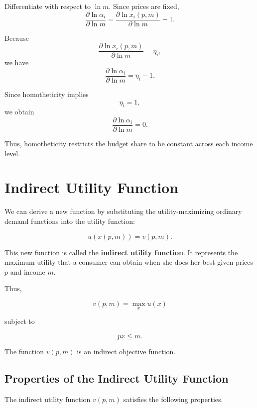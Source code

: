 Differentiate with respect to \(\ln m\). Since prices are fixed,
\[
\frac{\partial \ln \alpha_i}{\partial \ln m}
=
\frac{\partial \ln x_i(p,m)}{\partial \ln m}
-
1.
\]

Because
\[
\frac{\partial \ln x_i(p,m)}{\partial \ln m}
=
\eta_i,
\]
we have
\[
\frac{\partial \ln \alpha_i}{\partial \ln m}
=
\eta_i-1.
\]

Since homotheticity implies
\[
\eta_i=1,
\]
we obtain
\[
\frac{\partial \ln \alpha_i}{\partial \ln m}=0.
\]

Thus, homotheticity restricts the budget share to be constant across each income level.



\section{Indirect Utility Function}

We can derive a new function by substituting the utility-maximizing ordinary demand functions into the utility function:

\[
u(x(p,m)) = v(p,m).
\]

This new function is called the \textbf{indirect utility function}. It represents the maximum utility that a consumer can obtain when she does her best given prices \(p\) and income \(m\).

Thus,

\[
v(p,m)
=
\max_x u(x)
\]

subject to

\[
px \le m.
\]

The function \(v(p,m)\) is an indirect objective function.

\subsection{Properties of the Indirect Utility Function}

The indirect utility function \(v(p,m)\) satisfies the following properties.

